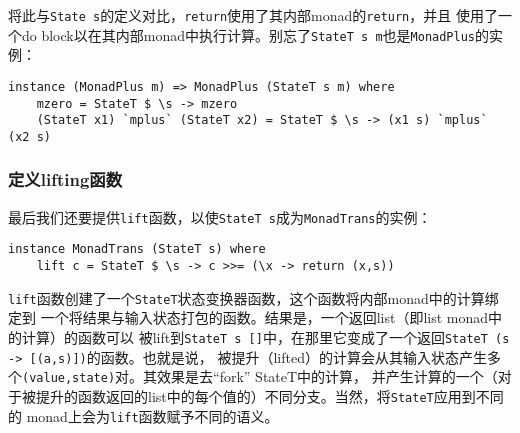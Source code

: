 \noindent{}将此与\texttt{State s}的定义对比，\texttt{return}使用了其内部monad的\texttt{return}，并且
使用了一个do block以在其内部monad中执行计算。别忘了\texttt{StateT s m}也是\texttt{MonadPlus}的实例：
\begin{verbatim}
instance (MonadPlus m) => MonadPlus (StateT s m) where
    mzero = StateT $ \s -> mzero
    (StateT x1) `mplus` (StateT x2) = StateT $ \s -> (x1 s) `mplus` (x2 s)
\end{verbatim}

\vspace{-0.5em}
\subsubsection{定义lifting函数}
\noindent{}最后我们还要提供\texttt{lift}函数，以使\texttt{StateT s}成为\texttt{MonadTrans}的实例：
\begin{verbatim}
instance MonadTrans (StateT s) where
    lift c = StateT $ \s -> c >>= (\x -> return (x,s))
\end{verbatim}
\indent{}\texttt{lift}函数创建了一个\texttt{StateT}状态变换器函数，这个函数将内部monad中的计算绑定到
一个将结果与输入状态打包的函数。结果是，一个返回list（即list monad中的计算）的函数可以
被lift到\texttt{StateT s []}中，在那里它变成了一个返回\texttt{StateT (s -> [(a,s)])}的函数。也就是说，
被提升（lifted）的计算会从其输入状态产生多个\texttt{(value,state)}对。其效果是去``fork'' StateT中的计算，
并产生计算的一个（对于被提升的函数返回的list中的每个值的）不同分支。当然，将\texttt{StateT}应用到不同的
monad上会为\texttt{lift}函数赋予不同的语义。
